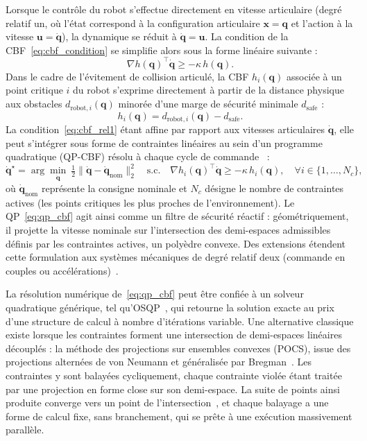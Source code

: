 Lorsque le contrôle du robot s'effectue directement en vitesse articulaire (degré relatif un, où l'état correspond à la configuration articulaire $\mathbf{x} = \mathbf{q}$ et l'action à la vitesse $\mathbf{u} = \dot{\mathbf{q}}$), la dynamique se réduit à $\dot{\mathbf{q}} = \mathbf{u}$. La condition de la \ac{CBF}~\eqref{eq:cbf_condition} se simplifie alors sous la forme linéaire suivante :
\begin{equation}
\label{eq:cbf_rel1}
\nabla h(\mathbf{q})^{\top}\dot{\mathbf{q}} \ge -\kappa\, h(\mathbf{q}).
\end{equation}
Dans le cadre de l'évitement de collision articulé, la \ac{CBF} $h_i(\mathbf{q})$ associée à un point critique $i$ du robot s'exprime directement à partir de la distance physique aux obstacles $d_{\text{robot}, i}(\mathbf{q})$ minorée d'une marge de sécurité minimale $d_{\text{safe}}$ :
\begin{equation}
h_i(\mathbf{q}) = d_{\text{robot}, i}(\mathbf{q}) - d_{\text{safe}}.
\end{equation}
La condition~\eqref{eq:cbf_rel1} étant affine par rapport aux vitesses articulaires $\dot{\mathbf{q}}$, elle peut s'intégrer sous forme de contraintes linéaires au sein d'un programme quadratique (\ac{QP}-\ac{CBF}) résolu à chaque cycle de commande~\cite{Ames2017Control} :
\begin{equation}
\label{eq:qp_cbf}
\dot{\mathbf{q}}^{\star}=\arg\min_{\dot{\mathbf{q}}}\ \tfrac{1}{2}\big\|\dot{\mathbf{q}}-\dot{\mathbf{q}}_{\mathrm{nom}}\big\|_2^2 \quad \text{s.c.} \quad \nabla h_i(\mathbf{q})^{\top}\dot{\mathbf{q}}\ge -\kappa\, h_i(\mathbf{q}), \quad \forall i \in \{1, \dots, N_c\},
\end{equation}
où $\dot{\mathbf{q}}_{\mathrm{nom}}$ représente la consigne nominale et $N_c$ désigne le nombre de contraintes actives (les points critiques les plus proches de l'environnement). Le \ac{QP}~\eqref{eq:qp_cbf} agit ainsi comme un filtre de sécurité réactif : géométriquement, il projette la vitesse nominale sur l'intersection des demi-espaces admissibles définis par les contraintes actives, un polyèdre convexe. Des extensions étendent cette formulation aux systèmes mécaniques de degré relatif deux (commande en couples ou accélérations)~\cite{Cortez2019Control}.

La résolution numérique de~\eqref{eq:qp_cbf} peut être confiée à un solveur quadratique générique, tel qu'\ac{OSQP}~\cite{Stellato2020Osqp}, qui retourne la solution exacte au prix d'une structure de calcul à nombre d'itérations variable. Une alternative classique existe lorsque les contraintes forment une intersection de demi-espaces linéaires découplés : la méthode des projections sur ensembles convexes (\ac{POCS}), issue des projections alternées de von Neumann et généralisée par Bregman~\cite{Bregman1965Method}. Les contraintes y sont balayées cycliquement, chaque contrainte violée étant traitée par une projection en forme close sur son demi-espace. La suite de points ainsi produite converge vers un point de l'intersection~\cite{Bauschke1996Projection}, et chaque balayage a une forme de calcul fixe, sans branchement, qui se prête à une exécution massivement parallèle.

